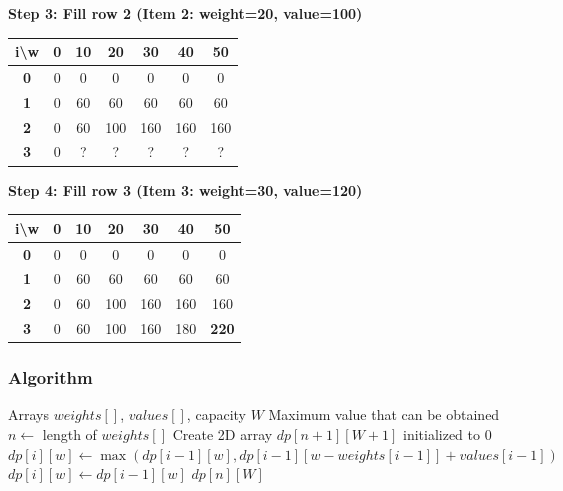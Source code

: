 \documentclass[12pt,a4paper]{article}
\begin{document}
\textbf{Step 3: Fill row 2 (Item 2: weight=20, value=100)}
\begin{center}
\begin{tabular}{|c|c|c|c|c|c|c|}
\hline
\textbf{i\textbackslash w} & \textbf{0} & \textbf{10} & \textbf{20} & \textbf{30} & \textbf{40} & \textbf{50} \\
\hline
\textbf{0} & 0 & 0 & 0 & 0 & 0 & 0 \\
\hline
\textbf{1} & 0 & 60 & 60 & 60 & 60 & 60 \\
\hline
\textbf{2} & 0 & 60 & 100 & 160 & 160 & 160 \\
\hline
\textbf{3} & 0 & ? & ? & ? & ? & ? \\
\hline
\end{tabular}
\end{center}

\textbf{Step 4: Fill row 3 (Item 3: weight=30, value=120)}
\begin{center}
\begin{tabular}{|c|c|c|c|c|c|c|}
\hline
\textbf{i\textbackslash w} & \textbf{0} & \textbf{10} & \textbf{20} & \textbf{30} & \textbf{40} & \textbf{50} \\
\hline
\textbf{0} & 0 & 0 & 0 & 0 & 0 & 0 \\
\hline
\textbf{1} & 0 & 60 & 60 & 60 & 60 & 60 \\
\hline
\textbf{2} & 0 & 60 & 100 & 160 & 160 & 160 \\
\hline
\textbf{3} & 0 & 60 & 100 & 160 & 180 & \textbf{220} \\
\hline
\end{tabular}
\end{center}

\subsubsection{Algorithm}
\begin{algorithm}
\caption{0-1 Knapsack - Tabulation}
\begin{algorithmic}
\REQUIRE Arrays $weights[]$, $values[]$, capacity $W$
\ENSURE Maximum value that can be obtained
\STATE $n \leftarrow$ length of $weights[]$
\STATE Create 2D array $dp[n+1][W+1]$ initialized to 0
            \STATE $dp[i][w] \leftarrow \max(dp[i-1][w], dp[i-1][w-weights[i-1]] + values[i-1])$
        \ELSE
            \STATE $dp[i][w] \leftarrow dp[i-1][w]$
        \ENDIF
    \ENDFOR
\ENDFOR
\RETURN $dp[n][W]$
\end{algorithmic}
\end{algorithm}
\end{document}

